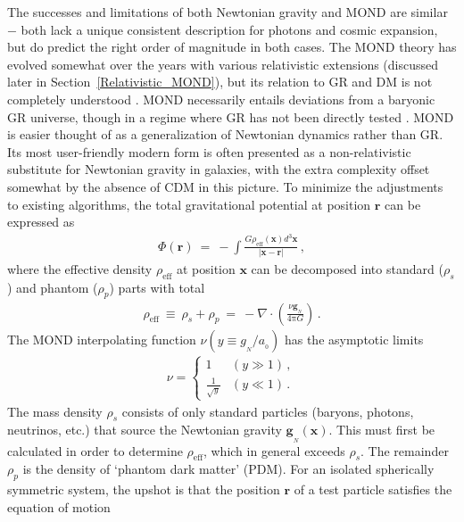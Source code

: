 \documentclass[fleqn,usenatbib,useAMS]{mnras} %
\begin{document}
The successes and limitations of both Newtonian gravity and MOND are similar $-$ both lack a unique consistent description for photons and cosmic expansion, but do predict the right order of magnitude in both cases. The MOND theory has evolved somewhat over the years with various relativistic extensions (discussed later in Section~\ref{Relativistic_MOND}), but its relation to GR and DM is not completely understood \citep[for a historical review, see][]{Sanders_2015}. MOND necessarily entails deviations from a baryonic GR universe, though in a regime where GR has not been directly tested \citep{Baker_2015}. MOND is easier thought of as a generalization of Newtonian dynamics rather than GR. Its most user-friendly modern form \citep[called quasi-linear MOND or QUMOND;][]{QUMOND} is often presented as a non-relativistic substitute for Newtonian gravity in galaxies, with the extra complexity offset somewhat by the absence of CDM in this picture. To minimize the adjustments to existing algorithms, the total gravitational potential at position $\bm{r}$ can be expressed as
\begin{eqnarray}
	\Phi \left( \bm{r} \right) ~=~ -\int \! \frac{G \rho_{\text{eff}} \left( \bm{x} \right) d^3\bm{x}}{\left| \bm{x} - \bm{r} \right|} \, ,
	\label{Phi_QUMOND}
\end{eqnarray}
where the effective density $\rho_{\text{eff}}$ at position $\bm{x}$ can be decomposed into standard ($\rho_s$) and phantom ($\rho_p$) parts with total
\begin{eqnarray}
	\rho_{\text{eff}} ~\equiv~ \rho_s + \rho_p ~=~ -\nabla \cdot \left( \frac{\nu\bm{g}_{_N}}{4 \mathrm{\pi} G} \right) \, .
	\label{rho_eff_QUMOND}
\end{eqnarray}
The MOND interpolating function $\nu \left( y \equiv g_{_N}/a_{_0} \right)$ has the asymptotic limits
\begin{eqnarray}
	\nu =
\left\{
	\begin{array}{ll}
		1 & \left( y \gg 1 \right) \, ,\\
		\frac{1}{\sqrt{y}} & \left( y \ll 1 \right) \, .
	\end{array}
	\label{nu_asymptotic}
\right.
\end{eqnarray}
The mass density $\rho_s$ consists of only standard particles (baryons, photons, neutrinos, etc.) that source the Newtonian gravity $\bm{g}_{_N} \left( \bm{x} \right)$. This must first be calculated in order to determine $\rho_{\text{eff}}$, which in general exceeds $\rho_s$. The remainder $\rho_p$ is the density of `phantom dark matter' (PDM). For an isolated spherically symmetric system, the upshot is that the position $\bm{r}$ of a test particle satisfies the equation of motion
\end{document}
